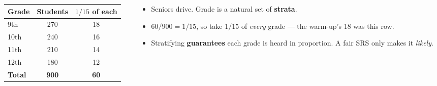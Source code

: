 \documentclass[aspectratio=169, 11pt]{beamer}
\newcommand{\redink}[1]{{\color{redacc}\bfseries #1}}
\begin{document}
\begin{frame}[t, plain]
  \vspace{2pt}
  \begin{columns}[t]
    \begin{column}{0.46\textwidth}
      \begin{center}
        \small
        \renewcommand{\arraystretch}{1.3}
        \begin{tabular}{@{} l c c @{}}
        \hline
        \textbf{Grade} & \textbf{Students} & \textbf{$1/15$ of each} \\
        \hline
        9th  & 270 & 18 \\
        10th & 240 & 16 \\
        11th & 210 & 14 \\
        12th & 180 & 12 \\
        \hline
        \textbf{Total} & \textbf{900} & \textbf{60} \\
        \hline
        \end{tabular}
      \end{center}
    \end{column}
    \begin{column}{0.5\textwidth}
      \begin{itemize}\setlength{\itemsep}{6pt}
        \item Seniors drive. Grade is a natural set of \textbf{strata}.
        \item $60/900 = 1/15$, so take $1/15$ of \emph{every} grade --- the warm-up's 18 was
              this row.
        \item Stratifying \redink{guarantees} each grade is heard in proportion. A fair SRS only
              makes it \emph{likely}.
      \end{itemize}
    \end{column}
  \end{columns}
\end{frame}
\end{document}
